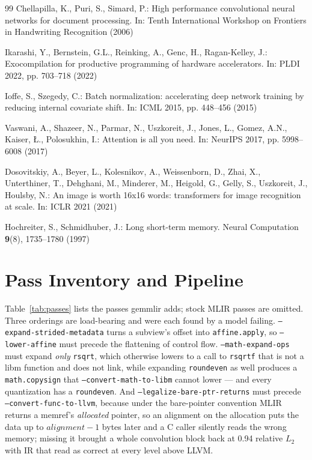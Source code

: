 \documentclass[runningheads]{llncs}
\begin{document}
\begin{thebibliography}{99}
Chellapilla, K., Puri, S., Simard, P.: High performance convolutional neural
networks for document processing. In: Tenth International Workshop on Frontiers
in Handwriting Recognition (2006)

Ikarashi, Y., Bernstein, G.L., Reinking, A., Genc, H., Ragan-Kelley, J.:
Exocompilation for productive programming of hardware accelerators. In: PLDI
2022, pp. 703--718 (2022)

Ioffe, S., Szegedy, C.: Batch normalization: accelerating deep network training
by reducing internal covariate shift. In: ICML 2015, pp. 448--456 (2015)

Vaswani, A., Shazeer, N., Parmar, N., Uszkoreit, J., Jones, L., Gomez, A.N.,
Kaiser, {\L}., Polosukhin, I.: Attention is all you need. In: NeurIPS 2017, pp.
5998--6008 (2017)

Dosovitskiy, A., Beyer, L., Kolesnikov, A., Weissenborn, D., Zhai, X.,
Unterthiner, T., Dehghani, M., Minderer, M., Heigold, G., Gelly, S., Uszkoreit,
J., Houlsby, N.: An image is worth 16x16 words: transformers for image
recognition at scale. In: ICLR 2021 (2021)

Hochreiter, S., Schmidhuber, J.: Long short-term memory. Neural Computation
\textbf{9}(8), 1735--1780 (1997)

\end{thebibliography}

\appendix

\section{Pass Inventory and Pipeline}
\label{app:passes}

Table~\ref{tab:passes} lists the passes gemmlir adds; stock MLIR passes are
omitted. Three orderings are load-bearing and were each found by a model
failing. \texttt{--expand-strided-metadata} turns a subview's offset into
\texttt{affine.apply}, so \texttt{--lower-affine} must precede the flattening of
control flow. \texttt{--math-expand-ops} must expand \emph{only} \texttt{rsqrt},
which otherwise lowers to a call to \texttt{rsqrtf} that is not a libm function and
does not link, while expanding \texttt{roundeven} as well produces a
\texttt{math.copysign} that \texttt{--convert-math-to-libm} cannot lower --- and
every quantization has a \texttt{roundeven}. And
\texttt{--legalize-bare-ptr-returns} must precede \texttt{--convert-func-to-llvm},
because under the bare-pointer convention MLIR returns a memref's \emph{allocated}
pointer, so an alignment on the allocation puts the data up to
$\mathit{alignment}-1$ bytes later and a C caller silently reads the wrong memory;
missing it brought a whole convolution block back at 0.94 relative $L_2$ with IR
that read as correct at every level above LLVM.
\end{document}
